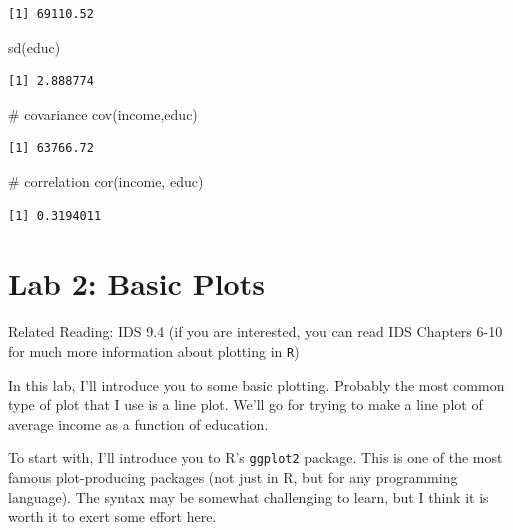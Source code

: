\documentclass[
  letterpaper,
  DIV=11,
  numbers=noendperiod]{scrreprt}
\newenvironment{Shaded}{\begin{snugshade}}{\end{snugshade}}
\newcommand{\CommentTok}[1]{\textcolor[rgb]{0.37,0.37,0.37}{#1}}
\newcommand{\FunctionTok}[1]{\textcolor[rgb]{0.28,0.35,0.67}{#1}}
\newcommand{\NormalTok}[1]{\textcolor[rgb]{0.00,0.23,0.31}{#1}}
\begin{document}
\begin{verbatim}
[1] 69110.52
\end{verbatim}

\begin{Shaded}
\begin{Highlighting}[]
\FunctionTok{sd}\NormalTok{(educ)}
\end{Highlighting}
\end{Shaded}

\begin{verbatim}
[1] 2.888774
\end{verbatim}

\begin{Shaded}
\begin{Highlighting}[]
\CommentTok{\# covariance}
\FunctionTok{cov}\NormalTok{(income,educ)}
\end{Highlighting}
\end{Shaded}

\begin{verbatim}
[1] 63766.72
\end{verbatim}

\begin{Shaded}
\begin{Highlighting}[]
\CommentTok{\# correlation}
\FunctionTok{cor}\NormalTok{(income, educ)}
\end{Highlighting}
\end{Shaded}

\begin{verbatim}
[1] 0.3194011
\end{verbatim}

\section{Lab 2: Basic Plots}\label{lab-2-basic-plots}

Related Reading: IDS 9.4 (if you are interested, you can read IDS
Chapters 6-10 for much more information about plotting in \texttt{R})

In this lab, I'll introduce you to some basic plotting. Probably the
most common type of plot that I use is a line plot. We'll go for trying
to make a line plot of average income as a function of education.

To start with, I'll introduce you to R's \texttt{ggplot2} package. This
is one of the most famous plot-producing packages (not just in R, but
for any programming language). The syntax may be somewhat challenging to
learn, but I think it is worth it to exert some effort here.
\end{document}
